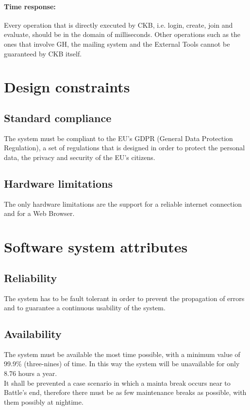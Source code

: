 \paragraph{Time response:} Every operation that is directly executed by CKB, i.e. login, create, join and evaluate, should be in the domain of milliseconds. Other operations such as the ones that involve GH, the mailing system and the External Tools cannot be guaranteed by CKB itself.



\section{Design constraints}
\label{sec:design_constraints}%


\subsection{Standard compliance}
\label{subsec:standard compliance}%
The system must be compliant to the EU's GDPR (General Data Protection Regulation), a set of regulations that is designed in order to protect the personal data, the privacy and security of the EU's citizens. 


\subsection{Hardware limitations}
\label{subsec:hardware_limitations}%
The only hardware limitations are the support for a reliable internet connection and for a Web Browser.


\section{Software system attributes}
\label{sec:software_system_attributes}%

\subsection{Reliability}
\label{subsec:reliability}%
The system has to be fault tolerant in order to prevent the propagation of errors and to guarantee a continuous usability of the system.

\subsection{Availability}
\label{subsec:availability}%
The system must be available the most time possible, with a minimum value of 99.9\% (three-nines) of time. In this way the system will be unavailable for only 8.76 hours a year. \\
It shall be prevented a case scenario in which a mainta break occurs near to Battle's end, therefore there must be as few maintenance breaks as possible, with them possibly at nightime.

